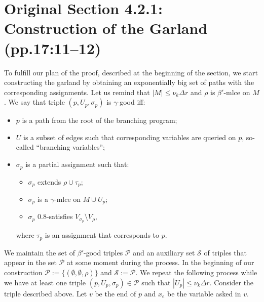 \documentclass[10pt,a4paper]{article}
\begin{document}
\section*{Original Section 4.2.1: Construction of the Garland (pp.17:11--12)}
To fulfill our plan of the proof, described at the beginning of the section, we start constructing the garland by obtaining an exponentially big set of paths with the corresponding assignments. Let us remind that $|M|\le\nu_k\Delta r$ and $\rho$ is $\beta'$-mlce on $M$.
We say that triple $(p,U_p,\sigma_p)$ is $\gamma$-good iff:
\begin{itemize}\item $p$ is a path from the root of the branching program;
\item $U$ is a subset of edges such that corresponding variables are queried on $p$, so-called ``branching variables'';
\item $\sigma_p$ is a partial assignment such that:
\begin{itemize}\item $\sigma_p$ extends $\rho\cup\tau_p$;
\item $\sigma_p$ is a $\gamma$-mlce on $M\cup U_p$;
\item $\sigma_p$ $0.8$-satisfies $V_{\sigma_p}\setminus V_\rho$,
\end{itemize}
where $\tau_p$ is an assignment that corresponds to $p$.\end{itemize}
We maintain the set of $\beta'$-good triples $\mathcal P$ and an auxiliary set $\mathcal S$ of triples that appear in the set $\mathcal P$ at some moment during the process. In the beginning of our construction $\mathcal P:=\{(\emptyset,\emptyset,\rho)\}$ and $\mathcal S:=\mathcal P$.
We repeat the following process while we have at least one triple $(p,U_p,\sigma_p)\in\mathcal P$ such that $|U_p|\le\nu_k\Delta r$.
Consider the triple described above. Let $v$ be the end of $p$ and $x_e$ be the variable asked in $v$.
\end{document}
